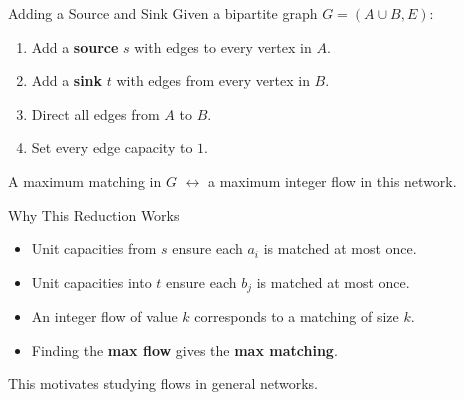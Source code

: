 \documentclass[aspectratio=169]{beamer}
\begin{document}
\begin{frame}{Adding a Source and Sink}
  Given a bipartite graph $G = (A \cup B, E)$:
  \begin{enumerate}
    \item Add a \textbf{source} $s$ with edges to every vertex in $A$.
    \item Add a \textbf{sink} $t$ with edges from every vertex in $B$.
    \item Direct all edges from $A$ to $B$.
    \item Set every edge capacity to $1$.
  \end{enumerate}

  \vspace{0.5em}
  \begin{center}
  \end{center}

  A maximum matching in $G$ $\longleftrightarrow$ a maximum integer flow in this network.
\end{frame}

\begin{frame}{Why This Reduction Works}
  \begin{itemize}
    \item Unit capacities from $s$ ensure each $a_i$ is matched at most once.
    \item Unit capacities into $t$ ensure each $b_j$ is matched at most once.
    \item An integer flow of value $k$ corresponds to a matching of size $k$.
    \item Finding the \textbf{max flow} gives the \textbf{max matching}.
  \end{itemize}

  \vspace{1em}
  This motivates studying flows in general networks.
\end{frame}
\end{document}
